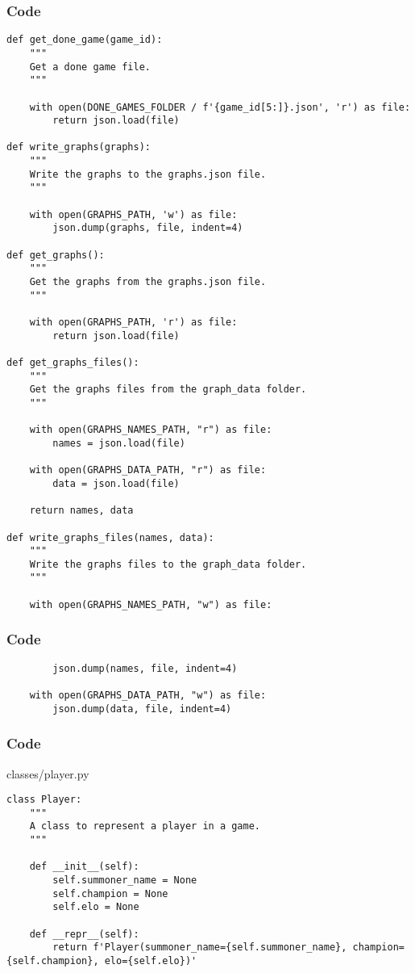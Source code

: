 \documentclass{beamer}
\begin{document}
\begin{frame}[fragile]
    \frametitle{Code}
    \fontsize{3pt}{5pt}\selectfont
    \begin{verbatim}
def get_done_game(game_id):
    """
    Get a done game file.
    """

    with open(DONE_GAMES_FOLDER / f'{game_id[5:]}.json', 'r') as file:
        return json.load(file)
    
def write_graphs(graphs):
    """
    Write the graphs to the graphs.json file.
    """
    
    with open(GRAPHS_PATH, 'w') as file:
        json.dump(graphs, file, indent=4)

def get_graphs():
    """
    Get the graphs from the graphs.json file.
    """

    with open(GRAPHS_PATH, 'r') as file:
        return json.load(file)

def get_graphs_files():
    """
    Get the graphs files from the graph_data folder.
    """

    with open(GRAPHS_NAMES_PATH, "r") as file:
        names = json.load(file)

    with open(GRAPHS_DATA_PATH, "r") as file:
        data = json.load(file)

    return names, data

def write_graphs_files(names, data):
    """
    Write the graphs files to the graph_data folder.
    """

    with open(GRAPHS_NAMES_PATH, "w") as file:
    \end{verbatim}
\end{frame}

\begin{frame}[t, fragile]
    \frametitle{Code}
    \fontsize{3pt}{5pt}\selectfont
    \begin{verbatim}
        json.dump(names, file, indent=4)

    with open(GRAPHS_DATA_PATH, "w") as file:
        json.dump(data, file, indent=4)
    \end{verbatim}
\end{frame}


\begin{frame}[t, fragile]
    \frametitle{Code}
    \scriptsize
    classes/player.py \newline
    \fontsize{3pt}{5pt}\selectfont
    \begin{verbatim}
class Player:
    """
    A class to represent a player in a game.
    """
    
    def __init__(self):
        self.summoner_name = None
        self.champion = None
        self.elo = None

    def __repr__(self):
        return f'Player(summoner_name={self.summoner_name}, champion={self.champion}, elo={self.elo})'
    \end{verbatim}
\end{frame}
\end{document}
